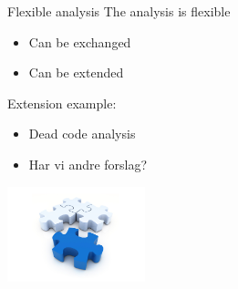 \begin{frame}{Flexible analysis}
  The analysis is flexible
  \begin{itemize}
    \item Can be exchanged
    \item Can be extended
  \end{itemize}

 Extension example:
  \begin{itemize}
    \item Dead code analysis
    \item Har vi andre forslag?
  \end{itemize}
  \center
  \includegraphics[width=0.3\textwidth]{graphics/modular}
\end{frame}

